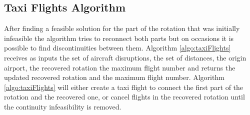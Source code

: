 \subsection{Taxi Flights Algorithm} \label{sec:taxiFlights}
After finding a feasible solution for the part of the rotation that was initially infeasible the algorithm tries to reconnect both parts but on occasions it is possible to find discontinuities between them. Algorithm \ref{algo:taxiFlights}  receives as inputs the set of aircraft disruptions, the set of distances, the origin airport, the recovered rotation the maximum flight number and returns the updated recovered rotation and the maximum flight number. Algorithm \ref{algo:taxiFlights} will either create a taxi flight to connect the first part of the rotation and the recovered one, or cancel flights in the recovered rotation until the continuity infeasibility is removed. 


